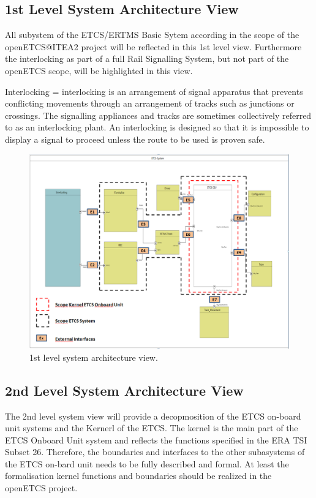 \subsection{1st Level System Architecture View}
All subystem of the ETCS/ERTMS Basic Sytem according in the scope of the openETCS@ITEA2 project will be reflected in this 1st level view. Furthermore the interlocking as part of a full Rail Signalling System, but not part of the openETCS scope, will be highlighted in this view.

Interlocking =  interlocking is an arrangement of signal apparatus that prevents conflicting movements through an arrangement of tracks such as junctions or crossings. The signalling appliances and tracks are sometimes collectively referred to as an interlocking plant. An interlocking is designed so that it is impossible to display a signal to proceed unless the route to be used is proven safe.


\begin{figure}
\centering
\includegraphics[scale=0.6]{images/1stlevelarchitecture}
\caption{1st level system architecture view.}
\label{1st level System Architecture view}
\end{figure}

\subsection{2nd Level System Architecture View}
The 2nd level system view will provide a decopmosition of the ETCS on-board unit systems and the Kernerl of the ETCS. The kernel is the main part of the ETCS Onboard Unit system and reflects the functions specified in the ERA TSI Subset 26. Therefore, the boundaries and interfaces to the other subasystems of the ETCS on-bard unit needs to be fully described and formal. At least the formalisation kernel functions and boundaries should be realized in the openETCS project.

